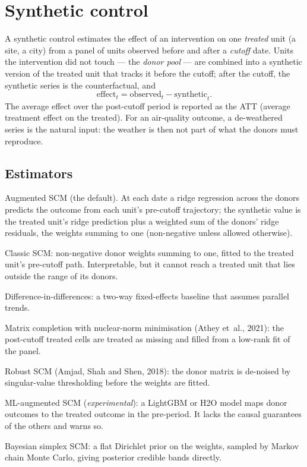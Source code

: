 \documentclass[11pt]{report}
\newcommand{\nosep}{\setlength{\itemsep}{0pt}\setlength{\parskip}{0pt}\setlength{\topsep}{2pt}}
\newcommand{\codeunderscore}{\textunderscore\allowbreak}
\newcommand{\code}[1]{\texttt{\let\_\codeunderscore #1}}
\begin{document}
\section{Synthetic control}\label{sec:scmtheory}
A synthetic control estimates the effect of an intervention on one \emph{treated} unit
(a site, a city) from a panel of units observed before and after a \emph{cutoff} date.
Units the intervention did not touch --- the \emph{donor pool} --- are combined into a
synthetic version of the treated unit that tracks it before the cutoff; after the cutoff,
the synthetic series is the counterfactual, and
\begin{equation}
  \text{effect}_t = \text{observed}_t - \text{synthetic}_t .
\end{equation}
The average effect over the post-cutoff period is reported as the ATT (average treatment
effect on the treated). For an air-quality outcome, a de-weathered series is the natural
input: the weather is then not part of what the donors must reproduce.

\subsection{Estimators}
\begin{description}\nosep
  \item[\code{scm}] Augmented SCM (the default). At each date a ridge regression across
        the donors predicts the outcome from each unit's pre-cutoff trajectory; the
        synthetic value is the treated unit's ridge prediction plus a weighted sum of the
        donors' ridge residuals, the weights summing to one (non-negative unless allowed
        otherwise).
  \item[\code{abadie}] Classic SCM: non-negative donor weights summing to one, fitted to
        the treated unit's pre-cutoff path. Interpretable, but it cannot reach a treated
        unit that lies outside the range of its donors.
  \item[\code{did}] Difference-in-differences: a two-way fixed-effects baseline that
        assumes parallel trends.
  \item[\code{mcnnm}] Matrix completion with nuclear-norm minimisation (Athey et~al.,
        2021): the post-cutoff treated cells are treated as missing and filled from a
        low-rank fit of the panel.
  \item[\code{robust}] Robust SCM (Amjad, Shah and Shen, 2018): the donor matrix is
        de-noised by singular-value thresholding before the weights are fitted.
  \item[\code{mlscm}] ML-augmented SCM (\emph{experimental}): a LightGBM or H2O model maps donor
        outcomes to the treated outcome in the pre-period. It lacks the causal
        guarantees of the others and warns so.
  \item[\code{bayesian}] Bayesian simplex SCM: a flat Dirichlet prior on the weights,
        sampled by Markov chain Monte Carlo, giving posterior credible bands directly.
\end{description}
\end{document}
